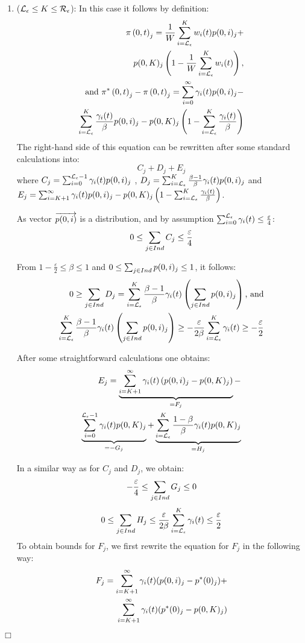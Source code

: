 \documentclass[times, 10pt,twocolumn]{article}
\newenvironment{proof}{\trivlist \item[\hskip \labelsep{\bf Proof}]}{\hfill\hbox{$\Box$}\endtrivlist}
\begin{document}
{\begin{proof}
\begin{enumerate}
				\item ($\mathcal{L}_{\epsilon} \leq K \leq \mathcal{R}_{\epsilon}$): In this case it follows by definition:
					\begin{eqnarray}
						\pi \left(0, t \right )_{j} = \frac{1}{W} \sum_{i=\mathcal{L}_{\epsilon}}^{K}w_{i}(t) p(0,i)_{j} + \nonumber \\ 
						p(0,K)_{j} \left(1- \frac{1}{W} \sum_{i=\mathcal{L}_{\epsilon}}^{K}w_{i}(t) \right), \nonumber \\
						\text{and } \pi^{*} \left(0, t \right )_{j} - \pi \left(0, t \right )_{j} =\sum_{i=0}^{\infty} \gamma_{i}(t) p(0,i)_{j} - \nonumber \\
						\sum_{i=\mathcal{L}_{\epsilon}}^{K}\frac{\gamma_{i}(t)}{\beta} p(0,i)_{j} -
						p(0,K)_{j} \left(1 - \sum_{i=\mathcal{L}_{\epsilon}}^{K}\frac{\gamma_{i}(t)}{\beta} \right) \nonumber
					\end{eqnarray}
						The right-hand side of this equation can be rewritten after some standard calculations into:
					\[
						C_{j} + D_{j} + E_{j}
					\]
					where $C_{j} = \sum_{i=0}^{\mathcal{L}_{\epsilon}-1} \gamma_{i}(t) p(0,i)_{j}$ , $D_{j} = \sum_{i=\mathcal{L}_{\epsilon}}^{K} \frac{\beta - 1}{\beta} \gamma_{i}(t) p(0,i)_{j} $ and $E_{j} = \sum_{i=K+1}^{\infty}\gamma_{i}(t) p(0,i)_{j} - p(0,K)_{j} \left(1 -	\sum_{i=\mathcal{L}_{\epsilon}}^{K}\frac{\gamma_{i}(t)}{\beta} \right)$.
					
					As vector $\overrightarrow{p(0,i)}$ is a distribution, and by assumption $\sum_{i=0}^{\mathcal{L}_{\epsilon}}\gamma_{i}(t) \leq \frac{\varepsilon}{4}$:
					\[
						 0 \leq \sum_{j \in Ind} C_{j} \leq \frac{\varepsilon}{4}
					\]

					From $1- \frac{\varepsilon}{2} \leq \beta \leq 1$ and $0 \leq \sum_{j \in Ind} p(0,i)_{j} \leq 1$, it follows:
					\begin{eqnarray}
						0 \geq \sum_{j \in Ind} D_{j}  = \sum_{i=\mathcal{L}_{\epsilon}}^{K} \frac{\beta - 1}{\beta} \gamma_{i}(t) \left( \sum_{j \in Ind} p(0,i)_{j} \right) \text{, and} \nonumber \\
						\sum_{i=\mathcal{L}_{\epsilon}}^{K} \frac{\beta - 1}{\beta} \gamma_{i}(t) \left( \sum_{j \in Ind} p(0,i)_{j} \right) \geq - \frac{\varepsilon}{2 \beta} \sum_{i=\mathcal{L}_{\epsilon}}^{K} \gamma_{i}(t) \geq - \frac{\varepsilon}{2} \nonumber
					\end{eqnarray}

					After some straightforward calculations one obtains:
					\begin{eqnarray}
						E_{j} = \underbrace{\sum_{i=K+1}^{\infty}\gamma_{i}(t) \left( p(0,i)_{j} - p(0,K)_{j} \right)}_{ = F_{j}} - \nonumber \\
						\underbrace{\sum_{i=0}^{\mathcal{L}_{\epsilon}-1}\gamma_{i}(t) p(0,K)_{j}}_{= -G_{j}} + \underbrace{\sum_{i=\mathcal{L}_{\epsilon}}^{K}\frac{1- \beta}{\beta} \gamma_{i}(t) p(0,K)_{j}}_{ = H_{j}} \nonumber
					\end{eqnarray}

					In a similar way as for $C_{j}$ and $D_{j}$, we obtain:
					\[
						- \frac{\varepsilon}{4} \leq \sum_{j \in Ind} G_{j} \leq 0
					\]
					\[
						 0 \leq \sum_{j \in Ind} H_{j} \leq \frac{\varepsilon}{2 \beta} \sum_{i=\mathcal{L}_{\epsilon}}^{K} \gamma_{i}(t) \leq \frac{\varepsilon}{2}
					\]
						To obtain bounds for $F_{j}$, we first rewrite the equation for $F_{j}$ in the following way:
					\begin{eqnarray}
						F_{j} = \sum_{i=K+1}^{\infty}\gamma_{i}(t) (p(0,i)_{j} - p^{*}(0)_{j}) + \nonumber \\ \sum_{i=K+1}^{\infty} \gamma_{i}(t) (p^{*}(0)_{j} - p(0,K)_{j}) \nonumber
					\end{eqnarray}
							

\end{enumerate}
\end{proof}}
\end{document}
